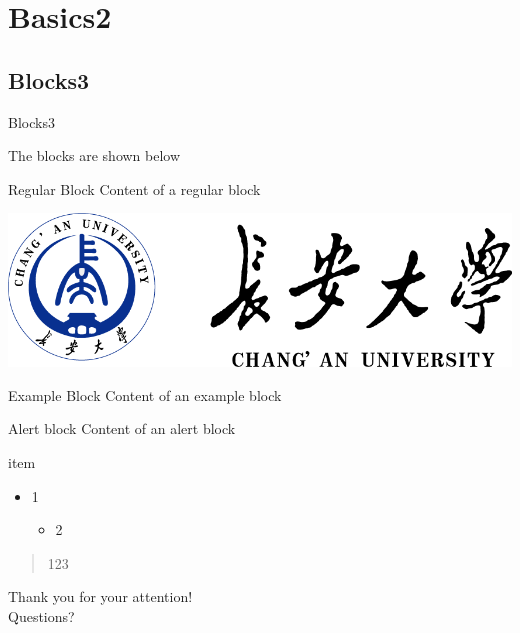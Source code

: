 \documentclass[10pt,aspectratio=169]{beamer} %
\begin{document}
\section{Basics2}
\subsection{Blocks3}
\begin{frame}[c]{Blocks3}
	
	The blocks are shown below
	\begin{block}{Regular Block}
		Content of a regular block
	\end{block}

\includegraphics[width=0.7\linewidth]{logo/chdlogolong}	
	\begin{exampleblock}{Example Block}
		Content of an example block
	\end{exampleblock}
	
	\begin{alertblock}{Alert block}
		Content of an alert block
	\end{alertblock}
	
\end{frame}
\begin{frame}{item}
	\begin{itemize}[<+->]
		\item 1\\
		      \begin{itemize}
			      \item 2
		      \end{itemize}
	\end{itemize}
	\begin{quotation}
		123
	\end{quotation}
\end{frame}
\begin{frame}%
	\vfill
	\centering
	{
		\centering \Huge \color{white} Thank you for your attention!\\[10pt]Questions?
	}
	\vfill
\end{frame}
\end{document}
